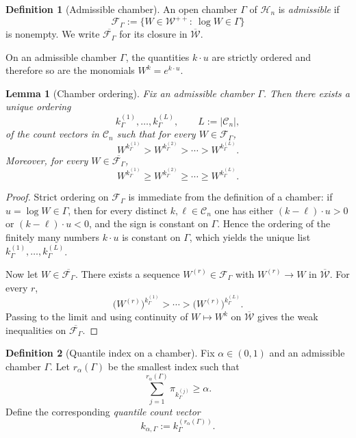 \documentclass[11pt]{article}
\newtheorem{lemma}[lemma]{Lemma}
\theoremstyle{definition}
\newtheorem{definition}[definition]{Definition}
\newcommand{\1}{\mathbf{1}}
\begin{document}
\begin{definition}[Admissible chamber]
An open chamber $\Gamma$ of $\mathcal H_n$ is \emph{admissible} if
\[
\mathcal F_\Gamma:=\{W\in\mathcal W^{++}:\ \log W\in\Gamma\}
\]
is nonempty. We write $\overline{\mathcal F_\Gamma}$ for its closure in $\overline{\mathcal W}$.
\end{definition}

On an admissible chamber $\Gamma$, the quantities $k\cdot u$ are strictly ordered and therefore so are the monomials $W^k=e^{k\cdot u}$.

\begin{lemma}[Chamber ordering]\label{lem:chamber-ordering}
Fix an admissible chamber $\Gamma$. Then there exists a unique ordering
\[
k^{(1)}_\Gamma,\dots,k^{(L)}_\Gamma,
\qquad L:=|\mathcal C_n|,
\]
of the count vectors in $\mathcal C_n$ such that for every $W\in\mathcal F_\Gamma$,
\[
W^{k^{(1)}_\Gamma}>W^{k^{(2)}_\Gamma}>\cdots>W^{k^{(L)}_\Gamma}.
\]
Moreover, for every $W\in\overline{\mathcal F_\Gamma}$,
\[
W^{k^{(1)}_\Gamma}\ge W^{k^{(2)}_\Gamma}\ge\cdots\ge W^{k^{(L)}_\Gamma}.
\]
\end{lemma}

\begin{proof}
Strict ordering on $\mathcal F_\Gamma$ is immediate from the definition of a chamber: if $u=\log W\in\Gamma$, then for every distinct $k,\ell\in\mathcal C_n$ one has either $(k-\ell)\cdot u>0$ or $(k-\ell)\cdot u<0$, and the sign is constant on $\Gamma$. Hence the ordering of the finitely many numbers $k\cdot u$ is constant on $\Gamma$, which yields the unique list $k^{(1)}_\Gamma,\dots,k^{(L)}_\Gamma$.

Now let $W\in\overline{\mathcal F_\Gamma}$. There exists a sequence $W^{(r)}\in\mathcal F_\Gamma$ with $W^{(r)}\to W$ in $\overline{\mathcal W}$. For every $r$,
\[
\bigl(W^{(r)}\bigr)^{k^{(1)}_\Gamma}>\cdots>\bigl(W^{(r)}\bigr)^{k^{(L)}_\Gamma}.
\]
Passing to the limit and using continuity of $W\mapsto W^k$ on $\overline{\mathcal W}$ gives the weak inequalities on $\overline{\mathcal F_\Gamma}$.
\end{proof}

\begin{definition}[Quantile index on a chamber]
Fix $\alpha\in(0,1)$ and an admissible chamber $\Gamma$. Let $r_\alpha(\Gamma)$ be the smallest index such that
\[
\sum_{j=1}^{r_\alpha(\Gamma)} \pi_{k^{(j)}_\Gamma}\ge \alpha.
\]
Define the corresponding \emph{quantile count vector}
\[
k_{\alpha,\Gamma}:=k^{(r_\alpha(\Gamma))}_\Gamma.
\]
\end{definition}
\end{document}
